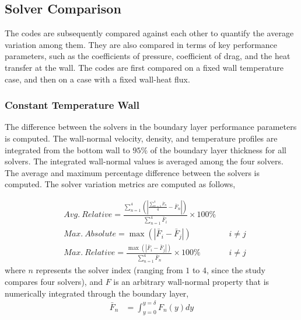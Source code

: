 \documentclass[journal ]{new-aiaa}
\begin{document}
\subsection{Solver Comparison}
The codes are subsequently compared against each other to quantify the average variation among them. They are also compared in terms of key performance parameters, such as the coefficients of pressure, coefficient of drag, and the heat transfer at the wall. The codes are first compared on a fixed wall temperature case, and then on a case with a fixed wall-heat flux.

\subsubsection{Constant Temperature Wall}
\label{sec:const_temp_wall}
 The difference between the solvers in the boundary layer performance parameters is computed. The wall-normal velocity, density, and temperature profiles are integrated from the bottom wall to $95\%$ of the boundary layer thickness for all solvers. The integrated wall-normal values is averaged among the four solvers. The average and maximum percentage difference between the solvers is computed. The solver variation metrics are computed as follows,

\begin{align}
        &Avg. \: Relative =   \frac{\sum_{n=1}^4 \left( \left| \frac{\sum_{n=1}^4 \bar{F}_n}{4} - \bar{F}_n \right| \right)}{\sum_{n=1}^4 \bar{F}_i} \times 100\%         \label{eq:var_avg_rel} \\
        &Max. \: Absolute =   \max\left( \left| \bar{F}_i - \bar{F}_j \right| \right)   && i \neq j \label{eq:var_max_abs} \\
        &Max. \: Relative =   \frac{\max\left( \left| \bar{F}_i - \bar{F}_j \right| \right)}{\sum_{n=1}^4 \bar{F}_n} \times 100\%   && i \neq j \label{eq:var_max_rel}         
\end{align} 
where $n$ represents the solver index (ranging from $1$ to $4$, since the study compares four solvers), and $F$ is an arbitrary wall-normal property that is numerically integrated through the boundary layer, 
\begin{align}
        \bar{F}_n &= \int_{y=0}^{y=\delta} F_n(y) dy
\end{align}
\end{document}
